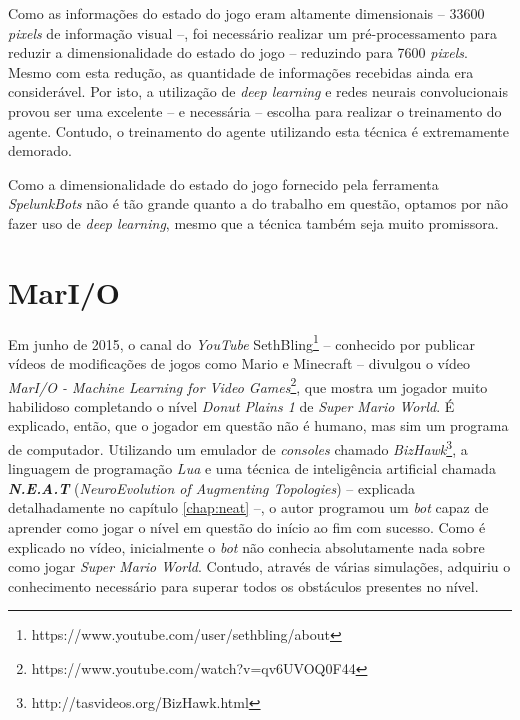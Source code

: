Como as informações do estado do jogo eram altamente dimensionais -- 33600
\textit{pixels} de informação visual --, foi necessário realizar um
pré-processamento para reduzir a dimensionalidade do estado do jogo -- reduzindo
para 7600 \textit{pixels}. Mesmo com esta redução, as quantidade de informações
recebidas ainda era considerável. Por isto, a utilização de \textit{deep
learning} e redes neurais convolucionais provou ser uma excelente -- e
necessária -- escolha para realizar o treinamento do agente. Contudo, o
treinamento do agente utilizando esta técnica é extremamente demorado.

Como a dimensionalidade do estado do jogo fornecido pela ferramenta
\textit{SpelunkBots} não é tão grande quanto a do trabalho em questão, optamos
por não fazer uso de \textit{deep learning}, mesmo que a técnica também seja
muito promissora.


\section{MarI/O}

Em junho de 2015, o canal do \textit{YouTube}
SethBling\footnote{https://www.youtube.com/user/sethbling/about} -- conhecido
por publicar vídeos de modificações de jogos como Mario e Minecraft -- divulgou
o vídeo \textit{MarI/O - Machine Learning for Video
Games}\footnote{https://www.youtube.com/watch?v=qv6UVOQ0F44}, que mostra um
jogador muito habilidoso completando o nível \textit{Donut Plains 1} de
\textit{Super Mario World}. É explicado, então, que o jogador em questão não é
humano, mas sim um programa de computador. Utilizando um emulador de
\textit{consoles} chamado
\textit{BizHawk}\footnote{http://tasvideos.org/BizHawk.html}, a linguagem de
programação \textit{Lua} e uma técnica de inteligência artificial chamada
\textit{\textbf{N.E.A.T}} (\textit{NeuroEvolution of Augmenting Topologies})
\cite{stanley:ec02} -- explicada detalhadamente no capítulo \ref{chap:neat} --,
o autor programou um \textit{bot} capaz de aprender como jogar o nível em
questão do início ao fim com sucesso. Como é explicado no vídeo, inicialmente o
\textit{bot} não conhecia absolutamente nada sobre como jogar \textit{Super
Mario World}. Contudo, através de várias simulações, adquiriu o conhecimento
necessário para superar todos os obstáculos presentes no nível.

